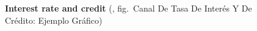 \documentclass[
  ignorenonframetext,
]{beamer}
\begin{document}
\begin{frame}{}
\label{section-18}
\begin{figure}


\caption{\label{fig-canal-tasa-interes-credito}\textbf{Interest rate and
credit} (, fig.~Canal De
Tasa De Interés Y De Crédito: Ejemplo Gráfico)}

\end{figure}%
\end{frame}
\end{document}
